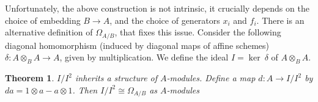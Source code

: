 \documentclass{article}
\theoremstyle{plain}
\newtheorem{theorem}{Theorem}[subsection]
\theoremstyle{definition}
\begin{document}
\noindent Unfortunately, the above construction is not intrinsic, it crucially depends on the choice of embedding $B\rightarrow A$, and the choice of generators $x_i$ and $f_i$.
There is an alternative definition of $\Omega_{A/B}$, that fixes this issue.
Consider the following diagonal homomorphism (induced by diagonal maps of affine schemes)  $\delta : A \otimes_B A \rightarrow A$, given by multiplication.
We define the ideal $I = \ker\:\delta$ of $A \otimes_B A$. 



\begin{theorem}
\label{second_def_Kalher}
    $I/I^2$ inherits a structure of $A$-modules. 
    Define a map $d:A\rightarrow I/I^2$ by $da = 1\otimes a-a\otimes 1$.
    Then $I/I^2 \cong \Omega_{A/B}$ as $A$-modules
\end{theorem}
\end{document}
